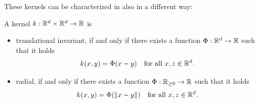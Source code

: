 These kernels can be characterized in also in a different way:

\begin{prop}
A kernel $k: \mathbb{R}^d \times \mathbb{R}^d \rightarrow \mathbb{R}$ is 
\begin{itemize}
\item translational invariant, if and only if there exists a function $\Phi: \mathbb{R}^d \rightarrow \mathbb{R}$ such that it holds
\begin{align*}
k(x, y) = \Phi(x - y) \quad \text{for all\ } x, z \in \mathbb{R}^d.
\end{align*}
\item radial, if and only if there exists a function $\Phi: \mathbb{R}_{\geq 0} \rightarrow \mathbb{R}$ such that it holds
\begin{align*}
k(x, y) = \Phi(\Vert x - y \Vert) \quad \text{for all\ } x, z \in \mathbb{R}^d.
\end{align*}
\end{itemize}
\end{prop}

